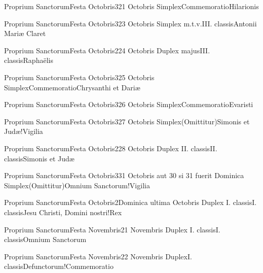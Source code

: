 \documentclass[psalterium-feriale.tex]{subfiles}
\begin{document}
	{Proprium Sanctorum}{Festa Octobris}{3}{21 Octobris}
	{Simplex}{Commemoratio}{Hilarionis}
	{}
	{}
\COPOaRubric

	{Proprium Sanctorum}{Festa Octobris}{3}{23 Octobris}
	{Simplex m.t.v.}{III. classis}{Antonii Mariæ Claret} %
	{}
	{}
\COPOaRubric

	{Proprium Sanctorum}{Festa Octobris}{2}{24 Octobris}
	{Duplex majus}{III. classis}{Raphaëlis}
	{}
	{}
\psalmodiapropria

	{Proprium Sanctorum}{Festa Octobris}{3}{25 Octobris}
	{Simplex}{Commemoratio}{Chrysanthi et Dariæ}
	{}
	{}
\PMEXaRubric

	{Proprium Sanctorum}{Festa Octobris}{3}{26 Octobris}
	{Simplex}{Commemoratio}{Evaristi}
	{}
	{}
\UMEXaRubric

	{Proprium Sanctorum}{Festa Octobris}{3}{27 Octobris}
	{Simplex}{(Omittitur)}{Simonis et Judæ!Vigilia}
	{}
	{}
\feriaRubric

	{Proprium Sanctorum}{Festa Octobris}{2}{28 Octobris}
	{Duplex II. classis}{II. classis}{Simonis et Judæ}
	{}
	{}
\psalmodiapropria

	{Proprium Sanctorum}{Festa Octobris}{3}{31 Octobris aut 30 si 31 fuerit Dominica}
	{Simplex}{(Omittitur)}{Omnium Sanctorum!Vigilia}
	{}
	{}
\feriaRubric

	{Proprium Sanctorum}{Festa Octobris}{2}{Dominica ultima Octobris}
	{Duplex I. classis}{I. classis}{Jesu Christi, Domini nostri!Rex}
	{}
	{}
\psalmodiapropria

	{Proprium Sanctorum}{Festa Novembris}{2}{1 Novembris}
	{Duplex I. classis}{I. classis}{Omnium Sanctorum}
	{}
	{}
\psalmodiapropria
{}

	{Proprium Sanctorum}{Festa Novembris}{2}{2 Novembris}
	{Duplex}{I. classis}{Defunctorum!Commemoratio}
	{}
	{}
\psalmodiapropria
\end{document}
